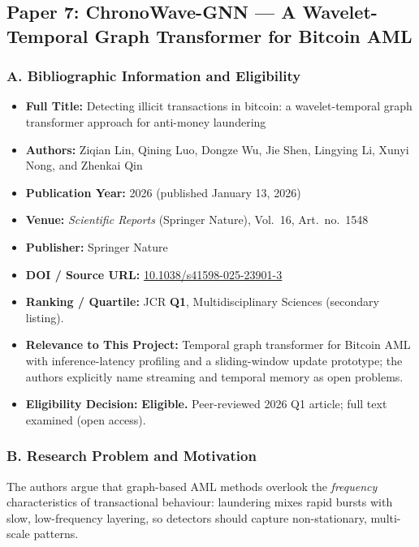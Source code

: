 \documentclass[11pt,a4paper]{article}
\begin{document}
\subsection{Paper 7: ChronoWave-GNN --- A Wavelet-Temporal Graph Transformer for Bitcoin AML}
\label{sec:p7_chronowave}

\subsubsection*{A. Bibliographic Information and Eligibility}
\begin{itemize}[leftmargin=*]
    \item \textbf{Full Title:} Detecting illicit transactions in bitcoin: a wavelet-temporal graph transformer approach for anti-money laundering
    \item \textbf{Authors:} Ziqian Lin, Qining Luo, Dongze Wu, Jie Shen, Lingying Li, Xunyi Nong, and Zhenkai Qin
    \item \textbf{Publication Year:} 2026 (published January 13, 2026)
    \item \textbf{Venue:} \textit{Scientific Reports} (Springer Nature), Vol.~16, Art.\ no.\ 1548
    \item \textbf{Publisher:} Springer Nature
    \item \textbf{DOI / Source URL:} \href{https://doi.org/10.1038/s41598-025-23901-3}{10.1038/s41598-025-23901-3}
    \item \textbf{Ranking / Quartile:} JCR \textbf{Q1}, Multidisciplinary Sciences (secondary listing).
    \item \textbf{Relevance to This Project:} Temporal graph transformer for Bitcoin AML with inference-latency profiling and a sliding-window update prototype; the authors explicitly name streaming and temporal memory as open problems.
    \item \textbf{Eligibility Decision:} \textbf{Eligible.} Peer-reviewed 2026 Q1 article; full text examined (open access).
\end{itemize}

\subsubsection*{B. Research Problem and Motivation}
The authors argue that graph-based AML methods overlook the \emph{frequency} characteristics of transactional behaviour: laundering mixes rapid bursts with slow, low-frequency layering, so detectors should capture non-stationary, multi-scale patterns.
\end{document}
